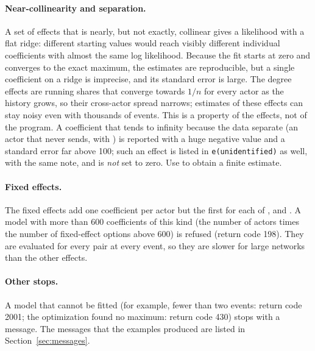 \paragraph{Near-collinearity and separation.} A set of effects that is nearly, but not exactly, collinear gives a likelihood with a flat ridge: different starting values would reach visibly different individual coefficients with almost the same log likelihood. Because the fit starts at zero and converges to the exact maximum, the estimates are reproducible, but a single coefficient on a ridge is imprecise, and its standard error is large. The degree effects are running shares that converge towards $1/n$ for every actor as the history grows, so their cross-actor spread narrows; estimates of these effects can stay noisy even with thousands of events. This is a property of the effects, not of the program. A coefficient that tends to infinity because the data separate (an actor that never sends, with ) is reported with a huge negative value and a standard error far above 100; such an effect is listed in \texttt{e(unidentified)} as well, with the same note, and is \emph{not} set to zero. Use  to obtain a finite estimate.

\paragraph{Fixed effects.} The fixed effects add one coefficient per actor but the first for each of ,  and . A model with more than 600 coefficients of this kind (the number of actors times the number of fixed-effect options above 600) is refused (return code 198). They are evaluated for every pair at every event, so they are slower for large networks than the other effects.

\paragraph{Other stops.} A model that cannot be fitted (for example, fewer than two events: return code 2001; the optimization found no maximum: return code 430) stops with a message. The messages that the examples produced are listed in Section~\ref{sec:messages}.
